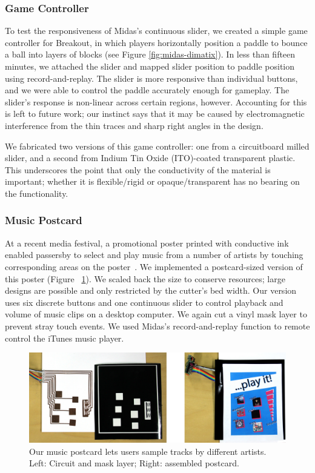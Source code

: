         \subsubsection{Game Controller}
To test the responsiveness of Midas's continuous slider, we created a simple game controller for Breakout, in which players horizontally position a paddle to bounce a ball into layers of blocks (see Figure \ref{fig:midas-dimatix}). In less than fifteen minutes, we attached the slider and mapped slider position to paddle position using record-and-replay.
The slider is more responsive than individual buttons, and we were able to control the paddle accurately enough for gameplay. The slider's response is non-linear across certain regions, however. Accounting for this is left to future work; our instinct says that it may be caused by electromagnetic interference from the thin traces and sharp right angles in the design.

We fabricated two versions of this game controller: one from a circuitboard milled slider, and a second from Indium Tin Oxide (ITO)-coated transparent plastic. This underscores the point that only the conductivity of the material is important; whether it is flexible/rigid or opaque/transparent has no bearing on the functionality.

        \subsubsection{Music Postcard}
At a recent media festival, a promotional poster printed with conductive ink enabled passersby to select and play music from a number of artists by touching corresponding areas on the poster~\cite{paperposter}. We implemented a postcard-sized version of this poster (Figure ~\ref{fig:midas-poster}). We scaled back the size to conserve resources; large designs are possible and only restricted by the cutter's bed width. Our version uses six discrete buttons and one continuous slider to control playback and volume of music clips on a desktop computer. We again cut a vinyl mask layer to prevent stray touch events. We used Midas's record-and-replay function to remote control the iTunes music player.

\begin{figure}[t]
\centering
\includegraphics[width=\textwidth]{figures/midas/poster3.jpg}
\caption{Our music postcard lets users sample tracks by different artists. Left: Circuit and mask layer; Right: assembled postcard.} 
\label{fig:midas-poster}
\end{figure}

